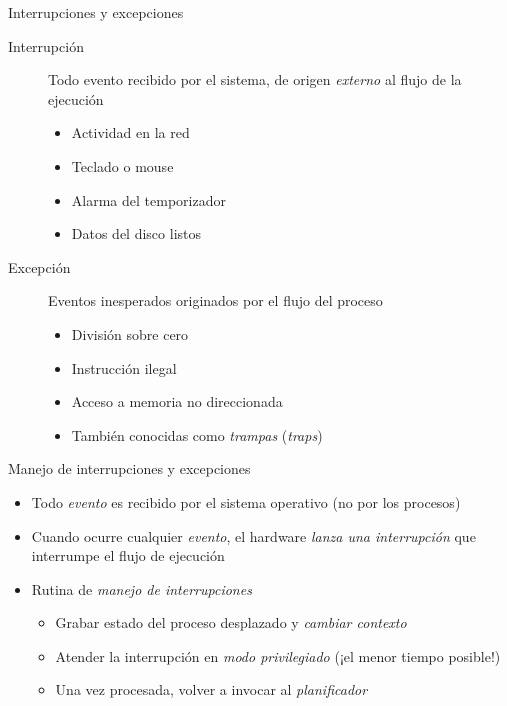 \documentclass[presentation]{beamer}
\begin{document}
\begin{frame}[label={sec:org18dbfca}]{Interrupciones y excepciones}
\begin{description}
\item[{Interrupción}] Todo evento recibido por el sistema, de origen
\emph{externo} al flujo de la ejecución
\begin{itemize}
\item Actividad en la red
\item Teclado o mouse
\item Alarma del temporizador
\item Datos del disco listos
\end{itemize}

\item[{Excepción}] Eventos inesperados originados por el flujo del
proceso
\begin{itemize}
\item División sobre cero
\item Instrucción ilegal
\item Acceso a memoria no direccionada
\item También conocidas como \emph{trampas} (\emph{traps})
\end{itemize}
\end{description}
\end{frame}

\begin{frame}[label={sec:org76585a9}]{Manejo de interrupciones y excepciones}
\begin{itemize}
\item Todo \emph{evento} es recibido por el sistema operativo (no por los
procesos)
\item Cuando ocurre cualquier \emph{evento}, el hardware \emph{lanza una
interrupción} que interrumpe el flujo de ejecución
\item Rutina de \emph{manejo de interrupciones}
\begin{itemize}
\item Grabar estado del proceso desplazado y \emph{cambiar contexto}
\item Atender la interrupción en \emph{modo privilegiado} (¡el menor tiempo
posible!)
\item Una vez procesada, volver a invocar al \emph{planificador}
\end{itemize}
\end{itemize}
\end{frame}
\end{document}
